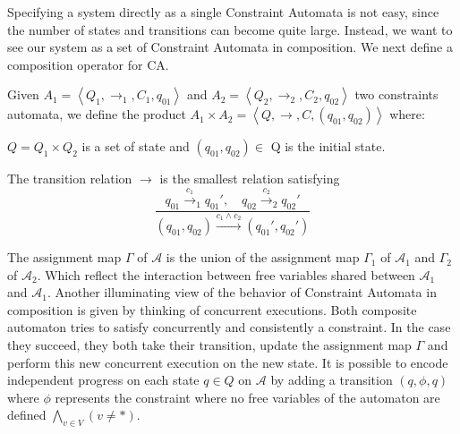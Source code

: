 Specifying a system directly as a single Constraint Automata is not easy, since the number of states and transitions can become quite large. Instead, we want to see our system as a set of Constraint Automata in composition. We next define a composition operator for CA.

\begin{definition}
	Given $A_1=\left\langle Q_1, \rightarrow_1, C_1, q_{01}\right\rangle$ and $A_2=\left\langle Q_2, \rightarrow_2, C_2, q_{02} \right\rangle$ two constraints automata, we define the product $ A_1 \times A_2 = \left \langle Q, \rightarrow, C, (q_{01},q_{02}) \right \rangle$ where: 
	\begin{list}{-}{ }
		\item $Q= Q_1 \times Q_2 $ is a set of state and $(q_{01},q_{02})\in$ Q is the initial state.
		\item The transition relation $\rightarrow$ is the smallest relation satisfying
		$$
		\frac{q_{01} \xrightarrow{c_1}_1 q_{01}' ,\quad q_{02} \xrightarrow{c_2}_2 q_{02}'}{(q_{01},q_{02}) \xrightarrow{c_1 \land c_2}(q_{01}',q_{02}')}
		$$
	\end{list}
\end{definition}

The assignment map $\Gamma$ of $\mathcal{A}$ is the union of the assignment map $\Gamma_1$ of $\mathcal{A}_1$ and $\Gamma_2$ of $\mathcal{A}_2$. Which reflect the interaction between free variables shared between $\mathcal{A}_1$ and $\mathcal{A}_1$. 
Another illuminating view of the behavior of Constraint Automata in composition is given by thinking of concurrent executions. Both composite automaton tries to satisfy concurrently and consistently a constraint. In the case they succeed, they both take their transition, update the assignment map $\Gamma$ and perform this new concurrent execution on the new state.
It is possible to encode independent progress on each state $q\in Q$ on $\mathcal{A}$ by adding a transition $(q,\phi,q)$ where $\phi$ represents the constraint where no free variables of the automaton are defined $\bigwedge_{v \in V} (v\not=*)$.